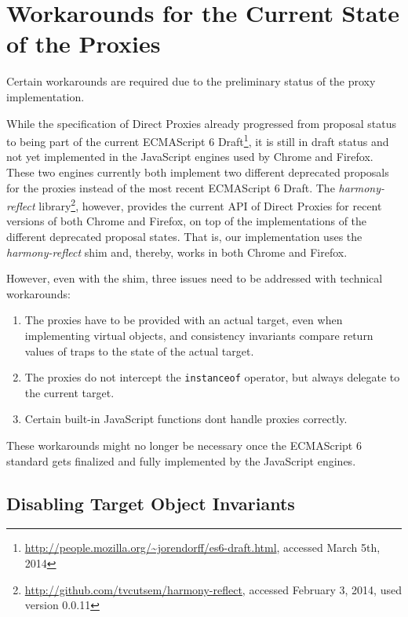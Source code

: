 \section{Workarounds for the Current State of the Proxies} \label{sec:IMPLEMENTATION:4}

Certain workarounds are required due to the preliminary status of the proxy implementation.

While the specification of Direct Proxies already progressed from proposal status to being part of the current ECMAScript 6 Draft\footnote{\url{http://people.mozilla.org/~jorendorff/es6-draft.html}, accessed March 5th, 2014}, it is still in draft status and not yet implemented in the JavaScript engines used by Chrome and Firefox.
These two engines currently both implement two different deprecated proposals for the proxies instead of the most recent ECMAScript 6 Draft.
The \emph{harmony-reflect} library\footnote{\url{http://github.com/tvcutsem/harmony-reflect}, accessed February 3, 2014, used version 0.0.11}, however, provides the current API of Direct Proxies for recent versions of both Chrome and Firefox, on top of the implementations of the different deprecated proposal states.
That is, our implementation uses the \emph{harmony-reflect} shim and, thereby, works in both Chrome and Firefox.

However, even with the shim, three issues need to be addressed with technical workarounds:

\begin{enumerate}
    \item The proxies have to be provided with an actual target, even when implementing virtual objects, and consistency invariants compare return values of traps to the state of the actual target. 
    \item The proxies do not intercept the \lstinline{instanceof} operator, but always delegate to the current target.
    \item Certain built-in JavaScript functions dont handle proxies correctly.
\end{enumerate}

These workarounds might no longer be necessary once the ECMAScript 6 standard gets finalized and fully implemented by the JavaScript engines. 


\subsection{Disabling Target Object Invariants}

